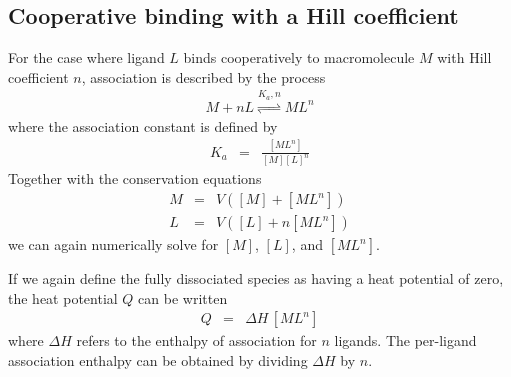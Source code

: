 \documentclass[aps,pre,twocolumn,nofootinbib,superscriptaddress,linenumbers]{revtex4-1}
\begin{document}
\begin{widetext}
\subsection{Cooperative binding with a Hill coefficient}
\label{section:cooperative-binding}

For the case where ligand $L$ binds cooperatively to macromolecule $M$ with Hill coefficient $n$, association is described by the process
\begin{eqnarray}
M + n L \overset{K_a, n}{\rightleftharpoons} ML^n
\end{eqnarray}
where the association constant is defined by
\begin{eqnarray}
K_a &=& \frac{[ML^n]}{[M][L]^n}
\end{eqnarray}
Together with the conservation equations
\begin{eqnarray}
M &=& V([M] + {[ML^n]}) \nonumber \\
L &=& V([L] + n {[M L^n]})
\end{eqnarray}
we can again numerically solve for $[M]$, $[L]$, and $[M L^n]$.

If we again define the fully dissociated species as having a heat potential of zero, the heat potential $Q$ can be written
\begin{eqnarray}
Q &=& \Delta H \, [M L^n]
\end{eqnarray}
where $\Delta H$ refers to the enthalpy of association for $n$ ligands.
The per-ligand association enthalpy can be obtained by dividing $\Delta H$ by $n$.

\end{widetext}


% 

\end{document}
